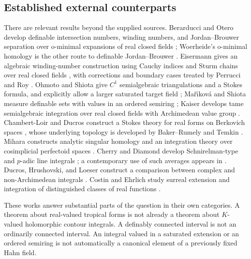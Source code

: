 \documentclass[11pt,letterpaper]{article}
\theoremstyle{definition}
\theoremstyle{remark}
\numberwithin{equation}{section}
\begin{document}
\subsection{Established external counterparts}
There are relevant results beyond the supplied sources. Berarducci and Otero
develop definable intersection numbers, winding numbers, and Jordan--Brouwer
separation over o-minimal expansions of real closed fields
\cite{BO,BOhomology,BOmeasure}; Woerheide's o-minimal homology is the other route
to definable Jordan--Brouwer \cite{Woerheide}. Eisermann gives an algebraic
winding-number construction using Cauchy indices and Sturm chains over real closed
fields \cite{Eisermann}, with corrections and boundary cases treated by Perrucci
and Roy \cite{PR}. Ohmoto and Shiota give $C^1$ semialgebraic triangulations and a
Stokes formula, and explicitly allow a larger saturated target field \cite{OS};
Ma\v r\'{\i}kov\'a and Shiota measure definable sets with values in an ordered
semiring \cite{MS}; Kaiser develops tame semialgebraic integration over real closed
fields with Archimedean value group \cite{Kaiser}. Chambert-Loir and Ducros
construct a Stokes theory for real forms on Berkovich spaces \cite{CLD}, whose
underlying topology is developed by Baker--Rumely and Temkin \cite{BR,Temkin}.
Mihara constructs analytic singular homology and an integration theory over
cosimplicial perfectoid spaces \cite{Mihara}. Cherry and Diamond develop
Schnirelman-type and $p$-adic line integrals \cite{Cherry,Diamond}; a contemporary
use of such averages appears in \cite{Ettayb}. Ducros, Hrushovski, and Loeser
construct a comparison between complex and non-Archimedean integrals \cite{DHL}.
Costin and Ehrlich study surreal extension and integration of distinguished
classes of real functions \cite{CE}.

These works answer substantial parts of the question in their own categories. A
theorem about real-valued tropical forms is not already a theorem about
$K$-valued holomorphic contour integrals. A definably connected interval is not an
ordinarily connected interval. An integral valued in a saturated extension or an
ordered semiring is not automatically a canonical element of a previously fixed
Hahn field.
\end{document}
